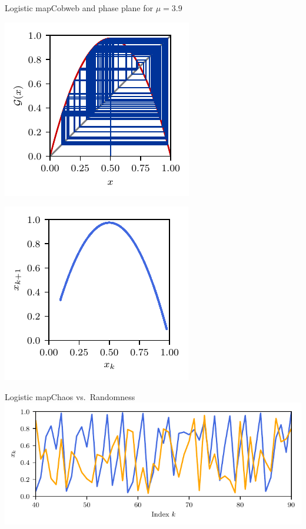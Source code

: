 \documentclass[usenames,dvipsnames,svgnames,10pt,aspectratio=169]{beamer}
\begin{document}
\begin{frame}[t, c]{Logistic map}{Cobweb and phase plane for $\mu = 3.9$}
	\begin{minipage}{.48\textwidth}
		\centering
		\includegraphics[width=.75\textwidth]{logistic_map_cobweb_plot_9}
	\end{minipage}%
	\begin{minipage}{.48\textwidth}
		\centering
		\includegraphics[width=.75\textwidth]{logistic_map_phase_plane_9}
	\end{minipage}

	\vspace{1cm}
\end{frame}

\begin{frame}[t, c]{Logistic map}{Chaos vs.\ Randomness}
	\centering
	\includegraphics[width=.75\textwidth]{chaos_vs_randomness}

	\vspace{1cm}
\end{frame}
\end{document}
